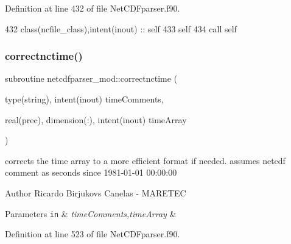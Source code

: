 Definition at line 432 of file Net\+C\+D\+Fparser.\+f90.


\begin{DoxyCode}
432     \textcolor{keywordtype}{class}(ncfile\_class),\textcolor{keywordtype}{intent(inout)} :: self
433     self%
434     \textcolor{keyword}{call }self%
\end{DoxyCode}
\mbox{\label{namespacenetcdfparser__mod_af93319fde6cf6baedb7fe27bf3396e7b}} 
\subsubsection{\texorpdfstring{correctnctime()}{correctnctime()}}
{\footnotesize\ttfamily subroutine netcdfparser\+\_\+mod\+::correctnctime (\begin{DoxyParamCaption}\item[{type(string), intent(inout)}]{time\+Comments,  }\item[{real(prec), dimension(\+:), intent(inout)}]{time\+Array }\end{DoxyParamCaption})\hspace{0.3cm}{\ttfamily [private]}}



corrects the time array to a more efficient format if needed. assumes netcdf comment as \textquotesingle{}seconds since 1981-\/01-\/01 00\+:00\+:00\textquotesingle{} 

\begin{DoxyAuthor}{Author}
Ricardo Birjukovs Canelas -\/ M\+A\+R\+E\+T\+EC 
\end{DoxyAuthor}

\begin{DoxyParams}[1]{Parameters}
\mbox{\tt in}  & {\em time\+Comments,time\+Array} & \\
\hline
\end{DoxyParams}


Definition at line 523 of file Net\+C\+D\+Fparser.\+f90.


